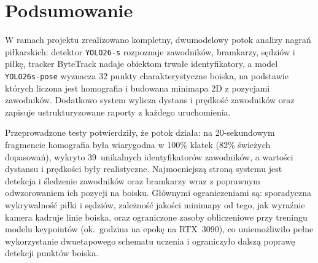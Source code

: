 \documentclass[11pt,a4paper]{article}
\begin{document}
\section{Podsumowanie}

W ramach projektu zrealizowano kompletny, dwumodelowy potok analizy nagrań
piłkarskich: detektor \texttt{YOLO26-s} rozpoznaje zawodników, bramkarzy,
sędziów i piłkę, tracker ByteTrack nadaje obiektom trwałe identyfikatory, a model
\texttt{YOLO26s-pose} wyznacza 32 punkty charakterystyczne boiska, na podstawie
których liczona jest homografia i budowana minimapa 2D z pozycjami zawodników.
Dodatkowo system wylicza dystans i prędkość zawodników oraz zapisuje
ustrukturyzowane raporty z każdego uruchomienia.

Przeprowadzone testy potwierdziły, że potok działa: na 20-sekundowym fragmencie
homografia była wiarygodna w 100\% klatek (82\% świeżych dopasowań), wykryto
39~unikalnych identyfikatorów zawodników, a wartości dystansu i prędkości były
realistyczne. Najmocniejszą stroną systemu jest detekcja i śledzenie
zawodników oraz bramkarzy wraz z poprawnym odwzorowaniem ich pozycji na boisku.
Głównymi ograniczeniami są: sporadyczna wykrywalność piłki i sędziów,
zależność jakości minimapy od tego, jak wyraźnie kamera kadruje linie boiska,
oraz ograniczone zasoby obliczeniowe przy treningu modelu keypointów (ok.\
godzina na epokę na RTX~3090), co uniemożliwiło pełne wykorzystanie
dwuetapowego schematu uczenia i ograniczyło dalszą poprawę detekcji punktów
boiska.
\end{document}
